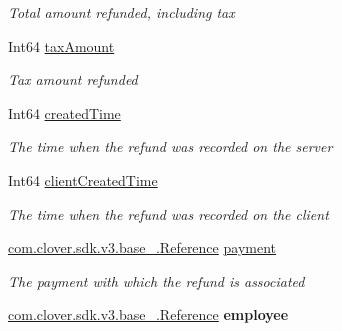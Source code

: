 \begin{DoxyCompactItemize}
\begin{DoxyCompactList}\small\item\em Total amount refunded, including tax \end{DoxyCompactList}\item 
Int64 \hyperlink{classcom_1_1clover_1_1sdk_1_1v3_1_1payments_1_1_refund_a7c8a0b3ac90acd6707b4a6e1bd455488}{tax\+Amount}
\begin{DoxyCompactList}\small\item\em Tax amount refunded \end{DoxyCompactList}\item 
Int64 \hyperlink{classcom_1_1clover_1_1sdk_1_1v3_1_1payments_1_1_refund_ae878b786bc60ae272cc0fe8b71f34929}{created\+Time}
\begin{DoxyCompactList}\small\item\em The time when the refund was recorded on the server \end{DoxyCompactList}\item 
Int64 \hyperlink{classcom_1_1clover_1_1sdk_1_1v3_1_1payments_1_1_refund_af1784c72040d7785847b2f170661e5a5}{client\+Created\+Time}
\begin{DoxyCompactList}\small\item\em The time when the refund was recorded on the client \end{DoxyCompactList}\item 
\hyperlink{classcom_1_1clover_1_1sdk_1_1v3_1_1base___1_1_reference}{com.\+clover.\+sdk.\+v3.\+base\+\_\+.\+Reference} \hyperlink{classcom_1_1clover_1_1sdk_1_1v3_1_1payments_1_1_refund_a4adaa81a745b0cbfd7ed26d62f4cae13}{payment}
\begin{DoxyCompactList}\small\item\em The payment with which the refund is associated \end{DoxyCompactList}\item 
\mbox{\label{classcom_1_1clover_1_1sdk_1_1v3_1_1payments_1_1_refund_aabe33b851988730312b3f9468c1817f8}} 
\hyperlink{classcom_1_1clover_1_1sdk_1_1v3_1_1base___1_1_reference}{com.\+clover.\+sdk.\+v3.\+base\+\_\+.\+Reference} {\bfseries employee}

\end{DoxyCompactItemize}
